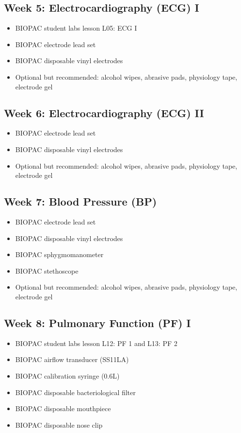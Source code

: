 \documentclass{article}
\begin{document}
\subsection*{Week 5: Electrocardiography (ECG) I}
\begin{itemize}
	\item BIOPAC student labs lesson L05: ECG I
	\item BIOPAC electrode lead set
	\item BIOPAC disposable vinyl electrodes
	\item Optional but recommended: alcohol wipes, abrasive pads, physiology tape, electrode gel
\end{itemize}

\subsection*{Week 6: Electrocardiography (ECG) II}
\begin{itemize}
	\item BIOPAC electrode lead set
	\item BIOPAC disposable vinyl electrodes
	\item Optional but recommended: alcohol wipes, abrasive pads, physiology tape, electrode gel
\end{itemize}

\subsection*{Week 7: Blood Pressure (BP)}
\begin{itemize}
	\item BIOPAC electrode lead set
	\item BIOPAC disposable vinyl electrodes
	\item BIOPAC sphygmomanometer
	\item BIOPAC stethoscope
	\item Optional but recommended: alcohol wipes, abrasive pads, physiology tape, electrode gel
\end{itemize}

\subsection*{Week 8: Pulmonary Function (PF) I}
\begin{itemize}
	\item BIOPAC student labs lesson L12: PF 1 and L13: PF 2
	\item BIOPAC airflow transducer (SS11LA)
	\item BIOPAC calibration syringe (0.6L)
	\item BIOPAC disposable bacteriological filter
	\item BIOPAC disposable mouthpiece
	\item BIOPAC disposable nose clip
\end{itemize}
\end{document}
